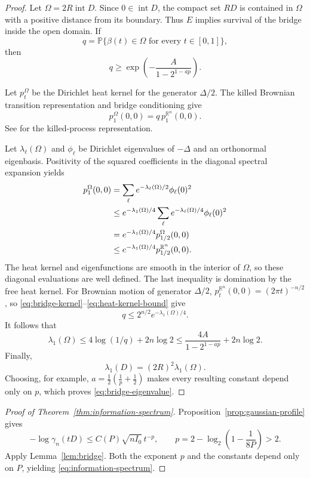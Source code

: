 \documentclass[11pt]{amsart}
\numberwithin{equation}{section}
\theoremstyle{definition}
\theoremstyle{remark}
\newcommand{\R}{\mathbb R}
\newcommand{\Prob}{\mathbb P}
\newcommand{\gam}{\gamma_n}
\DeclareMathOperator{\Int}{int}
\begin{document}
\begin{proof}
Let \(\Omega=2R \Int D\).
Since \(0\in \Int D\), the compact set \(RD\) is contained in \(\Omega\)
with a positive distance from its boundary. Thus \(E\) implies
survival of the bridge inside the open domain. If
\[
q=\Prob\{\beta(t)\in\Omega\text{ for every }t\in[0,1]\},
\]
then
\begin{equation}\label{eq:q-lower}
q\ge\exp\left(-\frac{A}{1-2^{1-ap}}\right).
\end{equation}

Let \(p_t^\Omega\) be the Dirichlet heat kernel for the generator
\(\Delta/2\). The killed Brownian transition representation and bridge
conditioning give
\begin{equation}\label{eq:bridge-kernel}
p_1^\Omega(0,0)=q\,p_1^{\R^n}(0,0).
\end{equation}
See \cite[Section~7.4]{MP10} for the killed-process representation.

Let \(\lambda_\ell(\Omega)\) and \(\phi_\ell\) be Dirichlet
eigenvalues of \(-\Delta\) and an orthonormal eigenbasis. Positivity of
the squared coefficients in the diagonal spectral expansion yields
\begin{align}
p_1^\Omega(0,0)
&=\sum_\ell e^{-\lambda_\ell(\Omega)/2}\phi_\ell(0)^2\notag\\
&\le e^{-\lambda_1(\Omega)/4}
  \sum_\ell e^{-\lambda_\ell(\Omega)/4}\phi_\ell(0)^2\notag\\
&=e^{-\lambda_1(\Omega)/4}p_{1/2}^\Omega(0,0)\notag\\
&\le e^{-\lambda_1(\Omega)/4}p_{1/2}^{\R^n}(0,0).
\label{eq:heat-kernel-bound}
\end{align}
The heat kernel and eigenfunctions are smooth in the interior of
\(\Omega\), so these diagonal evaluations are well defined. The last
inequality is domination by the free heat kernel.
For Brownian motion of generator \(\Delta/2\),
\(p_t^{\R^n}(0,0)=(2\pi t)^{-n/2}\), so
\eqref{eq:bridge-kernel}--\eqref{eq:heat-kernel-bound} give
\[
q\le 2^{n/2}e^{-\lambda_1(\Omega)/4}.
\]
It follows that
\[
\lambda_1(\Omega)
\le4\log(1/q)+2n\log2
\le\frac{4A}{1-2^{1-ap}}+2n\log2.
\]
Finally,
\[
\lambda_1(D)=(2R)^2\lambda_1(\Omega).
\]
Choosing, for example,
\(a=\tfrac12(\tfrac1p+\tfrac12)\) makes every resulting constant
depend only on \(p\), which proves \eqref{eq:bridge-eigenvalue}.
\end{proof}

\begin{proof}[Proof of Theorem~\ref{thm:information-spectrum}]
Proposition~\ref{prop:gaussian-profile} gives
\[
-\log\gam(tD)\le C(P)\sqrt{nI_0}\,t^{-p},
\qquad
p=2-\log_2\left(1-\frac1{8P}\right)>2.
\]
Apply Lemma~\ref{lem:bridge}. Both the exponent \(p\) and the
constants depend only on \(P\), yielding
\eqref{eq:information-spectrum}.
\end{proof}
\end{document}

